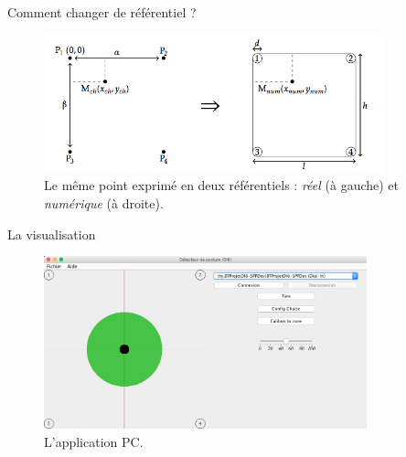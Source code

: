 \documentclass{beamer}
\begin{document}
\begin{frame}
\begin{block}{Comment changer de référentiel ?}
\begin{figure}[htbp]
\includegraphics[height=4cm]{images/refs}
\caption{Le même point exprimé en deux référentiels : \textit{réel} (à gauche) et \textit{numérique} (à droite).}
\label{fig:visualisation_referentiels}
\end{figure}
\end{block}
\end{frame}

\begin{frame}
\begin{block}{La visualisation}
\begin{figure}[htbp]
\begin{center}
\includegraphics[height=5cm]{images/screenshot_pc1}
\end{center}
\caption{L'application PC.}
\label{fig:screenshot_pc}
\end{figure}
\end{block}
\end{frame}
\end{document}
